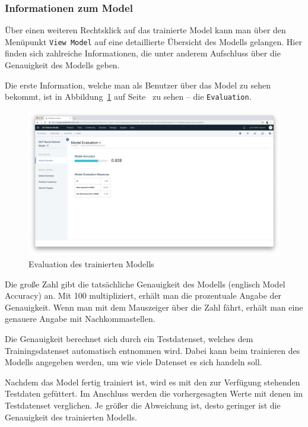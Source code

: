 \subsubsection{Informationen zum Model}
Über einen weiteren Rechtsklick auf das trainierte Model kann man über den Menüpunkt \texttt{View Model} auf eine
detaillierte Übersicht des Modells gelangen. Hier finden sich zahlreiche Informationen, die unter anderem Aufschluss
über die Genauigkeit des Modells geben.

Die erste Information, welche man als Benutzer über das Model zu sehen bekommt, ist in
Abbildung~\ref{fig:umsetzung_model_evaluation} auf Seite~\pageref{fig:umsetzung_model_evaluation} zu sehen -- die
\texttt{Evaluation}.

\begin{figure}[h]
    \centering
    \includegraphics[width=\textwidth]{images/kapitel_3/model_evaluation.png}
    \caption{Evaluation des trainierten Modells}
    \label{fig:umsetzung_model_evaluation}
\end{figure}

Die große Zahl gibt die tatsächliche Genauigkeit des Modells (englisch Model Accuracy) an. Mit 100 multipliziert, erhält
man die prozentuale Angabe der Genauigkeit. Wenn man mit dem Mauszeiger über die Zahl fährt, erhält man eine genauere
Angabe mit Nachkommastellen.

Die Genauigkeit berechnet sich durch ein Testdatenset, welches dem Trainingsdatenset automatisch entnommen wird. Dabei
kann beim trainieren des Modells angegeben werden, um wie viele Datenset es sich handeln soll.

Nachdem das Model fertig trainiert ist, wird es mit den zur Verfügung stehenden Testdaten gefüttert. Im Anschluss werden
die vorhergesagten Werte mit denen im Testdatenset verglichen. Je größer die Abweichung ist, desto geringer ist die
Genauigkeit des trainierten Modells.

